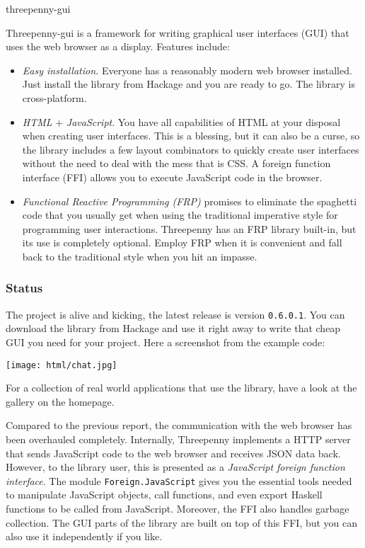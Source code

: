 \begin{hcarentry}[updated]{threepenny-gui}
\label{threepenny-gui}
\makeheader

Threepenny-gui is a framework for writing graphical user interfaces (GUI) that uses the web browser as a display. Features include:

\begin{itemize}
\item \emph{Easy installation.} Everyone has a reasonably modern web browser installed. Just install the library from Hackage and you are ready to go. The library is cross-platform.
\item \emph{HTML} + \emph{JavaScript}. You have all capabilities of HTML at your disposal when creating user interfaces. This is a blessing, but it can also be a curse, so the library includes a few layout combinators to quickly create user interfaces without the need to deal with the mess that is CSS. A foreign function interface (FFI) allows you to execute JavaScript code in the browser.
\item \emph{Functional Reactive Programming (FRP)} promises to eliminate the spaghetti code that you usually get when using the traditional imperative style for programming user interactions. Threepenny has an FRP library built-in, but its use is completely optional. Employ FRP when it is convenient and fall back to the traditional style when you hit an impasse.
\end{itemize}

\subsubsection*{Status}

The project is alive and kicking, the latest release is version \verb`0.6.0.1`. You can download the library from Hackage and use it right away to write that cheap GUI you need for your project. Here a screenshot from the example code:

\begin{center}
\texttt{[image: html/chat.jpg]}
\end{center}

For a collection of real world applications that use the library, have a look at the gallery on the homepage.

Compared to the previous report, the communication with the web browser has been overhauled completely. Internally, Threepenny implements a HTTP server that sends JavaScript code to the web browser and receives JSON data back. However, to the library user, this is presented as a \emph{JavaScript foreign function interface}. The module \verb`Foreign.JavaScript` gives you the essential tools needed to manipulate JavaScript objects, call functions, and even export Haskell functions to be called from JavaScript. Moreover, the FFI also handles garbage collection. The GUI parts of the library are built on top of this FFI, but you can also use it independently if you like.


\end{hcarentry}
